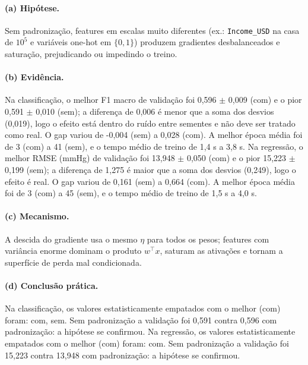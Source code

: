 \documentclass[11pt,a4paper]{article}
\begin{document}
\paragraph{(a) Hipótese.} Sem padronização, features em escalas muito diferentes (ex.: \texttt{Income\_USD} na casa de $10^5$ e variáveis one-hot em $\{0,1\}$) produzem gradientes desbalanceados e saturação, prejudicando ou impedindo o treino.

\paragraph{(b) Evidência.} Na classificação, o melhor F1 macro de validação foi 0,596 $\pm$ 0,009 (com) e o pior 0,591 $\pm$ 0,010 (sem); a diferença de 0,006 é menor que a soma dos desvios (0,019), logo o efeito está dentro do ruído entre sementes e não deve ser tratado como real. O gap variou de -0,004 (sem) a 0,028 (com). A melhor época média foi de 3 (com) a 41 (sem), e o tempo médio de treino de 1,4 s a 3,8 s. Na regressão, o melhor RMSE (mmHg) de validação foi 13,948 $\pm$ 0,050 (com) e o pior 15,223 $\pm$ 0,199 (sem); a diferença de 1,275 é maior que a soma dos desvios (0,249), logo o efeito é real. O gap variou de 0,161 (sem) a 0,664 (com). A melhor época média foi de 3 (com) a 45 (sem), e o tempo médio de treino de 1,5 s a 4,0 s.

\paragraph{(c) Mecanismo.} A descida do gradiente usa o mesmo $\eta$ para todos os pesos; features com variância enorme dominam o produto $w^\top x$, saturam as ativações e tornam a superfície de perda mal condicionada.

\paragraph{(d) Conclusão prática.} Na classificação, os valores estatisticamente empatados com o melhor (com) foram: com, sem. Sem padronização a validação foi 0,591 contra 0,596 com padronização: a hipótese se confirmou. Na regressão, os valores estatisticamente empatados com o melhor (com) foram: com. Sem padronização a validação foi 15,223 contra 13,948 com padronização: a hipótese se confirmou.
\end{document}
